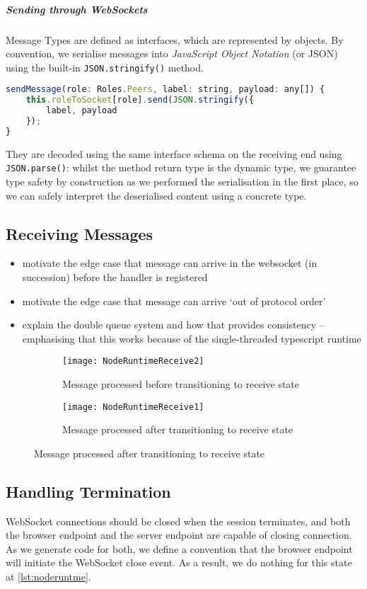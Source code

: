 \subparagraph{Sending through WebSockets}
Message Types are defined as interfaces, which
are represented by objects. By convention,
we serialise messages into \textit{JavaScript Object Notation}
(or JSON) \cite{json} using the built-in \texttt{JSON.stringify()}
method.

\begin{lstlisting}[language=javascript]
sendMessage(role: Roles.Peers, label: string, payload: any[]) {
	this.roleToSocket[role].send(JSON.stringify({
		label, payload
	});
}
\end{lstlisting}

They are decoded using the same interface schema on the receiving end
using \texttt{JSON.parse()}: whilst the method return type is the
dynamic  type, 
we guarantee type safety by construction
as we performed the serialisation in the first place, so
we can safely interpret the deserialised content 
using a concrete type.

\subsection{Receiving Messages}
\label{subsection:noderuntimereceive}
\begin{itemize}
\item motivate the edge case that message can arrive in the websocket (in succession) before the handler is registered
\item motivate the edge case that message can arrive `out of protocol order' 
\item explain the double queue system and how that provides consistency -- emphasising that this works because of the single-threaded typescript runtime
\end{itemize}

\begin{figure}[!ht]
\centering
\begin{subfigure}[b]{0.8\textwidth}
\centering
\texttt{[image: NodeRuntimeReceive2]}
\caption{Message processed before transitioning to receive state}
\label{subfig:nodereceivemsgfirst}
\end{subfigure}
\hfill
\begin{subfigure}[b]{0.8\textwidth}
\centering
\texttt{[image: NodeRuntimeReceive1]}
\caption{Message processed after transitioning to receive state}
\label{subfig:nodereceivehandlefirst}
\end{subfigure}
\label{fig:nodereceivecompare}
\end{figure}

\subsection{Handling Termination}
WebSocket connections should be closed when the session terminates,
and both the browser endpoint and the server endpoint are capable
of closing connection. As we generate code for both, we define
a convention that the browser endpoint will initiate the WebSocket
close event.
As a result, we do nothing for this state at \cref{lst:noderuntme}.